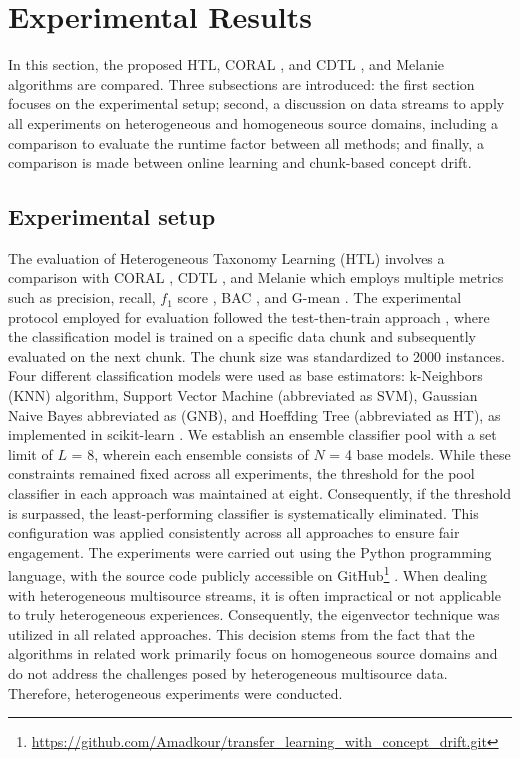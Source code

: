 
\section{Experimental Results}
\label{sec:6_Expsetup}

In this section, the proposed HTL, CORAL \cite{sun2016return}, and CDTL \cite{yang2021concept}, and Melanie \cite{dong2019multistream} algorithms are compared. Three subsections are introduced: the first section focuses on the experimental setup; second, a discussion on data streams to apply all experiments on heterogeneous and homogeneous source domains, including a comparison to evaluate the runtime factor between all methods; and finally, a comparison is made between online learning and chunk-based concept drift.
\subsection{Experimental setup}
The evaluation of Heterogeneous Taxonomy Learning (HTL) involves a comparison with CORAL \cite{sun2016return}, CDTL \cite{yang2021concept}, and Melanie \cite{dong2019multistream}  which employs multiple metrics such as precision, recall, $f_1$ score \cite{sasaki2007truth}, BAC \cite{brodersen2010balanced}, and G-mean \cite{kubat1997addressing}. The experimental protocol employed for evaluation followed the test-then-train approach \cite{krawczyk2017ensemble}, where the classification model is trained on a specific data chunk and subsequently evaluated on the next chunk. The chunk size was standardized to 2000 instances. Four different classification models were used as base estimators: k-Neighbors (KNN) algorithm, Support Vector Machine (abbreviated as SVM), Gaussian Naive Bayes abbreviated as (GNB), and Hoeffding Tree (abbreviated as HT), as implemented in scikit-learn \cite{frias2014online}. We establish an ensemble classifier pool with a set limit of $L$ = 8, wherein each ensemble consists of $N$ = 4 base models. While these constraints remained fixed across all experiments, the threshold for the pool classifier in each approach was maintained at eight. Consequently, if the threshold is surpassed, the least-performing classifier is systematically eliminated. This configuration was applied consistently across all approaches to ensure fair engagement. The experiments were carried out using the Python programming language, with the source code publicly accessible on GitHub\footnote{\url{https://github.com/Amadkour/transfer_learning_with_concept_drift.git}} . When dealing with heterogeneous multisource streams, it is often impractical or not applicable to truly heterogeneous experiences. Consequently, the eigenvector technique was utilized in all related approaches. This decision stems from the fact that the algorithms in related work primarily focus on homogeneous source domains and do not address the challenges posed by heterogeneous multisource data. Therefore, heterogeneous experiments were conducted.

